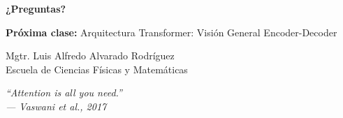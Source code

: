 \documentclass[aspectratio=169]{beamer}
\begin{document}
\begin{frame}
    \centering
    \Huge \textbf{¿Preguntas?}
    
    \vspace{0.8cm}
    \large
    \textbf{Próxima clase:} Arquitectura Transformer: Visión General Encoder-Decoder
    
    \vspace{0.5cm}
    \normalsize
    Mgtr. Luis Alfredo Alvarado Rodríguez\\
    \small Escuela de Ciencias Físicas y Matemáticas
    
    \vspace{0.5cm}
    \footnotesize
    \textit{``Attention is all you need.''\\--- Vaswani et al., 2017}
\end{frame}
\end{document}
